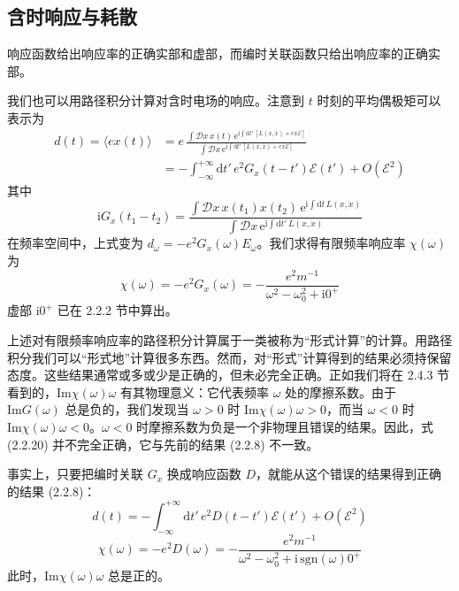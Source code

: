 \subsection{含时响应与耗散}

\begin{keypoints}
\item 响应函数给出响应率的正确实部和虚部，而编时关联函数只给出响应率的正确实部。
\end{keypoints}

我们也可以用路径积分计算对含时电场的响应。注意到 $t$ 时刻的平均偶极矩可以表示为
\begin{equation*}
\begin{aligned}
d(t)=\langle ex(t)\rangle&=e\,\frac{\int\mathcal{D}x\,x(t)\,\mathrm{e}^{\mathrm{i}\int\mathrm{d}t'\,[L(x,\dot{x})+ex\mathcal{E}]}}{\int\mathcal{D}x\,\mathrm{e}^{\mathrm{i}\int\mathrm{d}t'\,[L(x,\dot{x})+ex\mathcal{E}]}}\\
&=-\int_{-\infty}^{+\infty}\mathrm{d}t'\,e^2G_x(t-t')\mathcal{E}(t')+O(\mathcal{E}^2)
\end{aligned}
\end{equation*}
其中
\begin{equation*}
\mathrm{i}G_x(t_1-t_2)=\frac{\int\mathcal{D}x\,x(t_1)x(t_2)\,\mathrm{e}^{\mathrm{i}\int\mathrm{d}t\,L(x,\dot{x})}}{\int\mathcal{D}x\,\mathrm{e}^{\mathrm{i}\int\mathrm{d}t'\,L(x,\dot{x})}}
\end{equation*}
在频率空间中，上式变为 $d_\omega=-e^2G_x(\omega)E_\omega$。我们求得有限频率响应率 $\chi(\omega)$ 为
\begin{equation*}
\chi(\omega)=-e^2G_x(\omega)=-\frac{e^2m^{-1}}{\omega^2-\omega_0^2+\mathrm{i}0^+}\tag{2.2.20}
\end{equation*}
虚部 $\mathrm{i}0^+$ 已在 2.2.2 节中算出。

上述对有限频率响应率的路径积分计算属于一类被称为“形式计算”的计算。用路径积分我们可以“形式地”计算很多东西。然而，对“形式”计算得到的结果必须持保留态度。这些结果通常或多或少是正确的，但未必完全正确。正如我们将在 2.4.3 节看到的，$\mathrm{Im}\chi(\omega)\omega$ 有其物理意义：它代表频率 $\omega$ 处的摩擦系数。由于 $\mathrm{Im}G(\omega)$ 总是负的，我们发现当 $\omega>0$ 时 $\mathrm{Im}\chi(\omega)\omega>0$，而当 $\omega<0$ 时 $\mathrm{Im}\chi(\omega)\omega<0$。$\omega<0$ 时摩擦系数为负是一个非物理且错误的结果。因此，式 (2.2.20) 并不完全正确，它与先前的结果 (2.2.8) 不一致。

事实上，只要把编时关联 $G_x$ 换成响应函数 $D$，就能从这个错误的结果得到正确的结果 (2.2.8)：
\begin{equation*}
d(t)=-\int_{-\infty}^{+\infty}\mathrm{d}t'\,e^2D(t-t')\mathcal{E}(t')+O(\mathcal{E}^2)
\end{equation*}
\begin{equation*}
\chi(\omega)=-e^2D(\omega)=-\frac{e^2m^{-1}}{\omega^2-\omega_0^2+\mathrm{i}\,\mathrm{sgn}(\omega)0^+}
\end{equation*}
此时，$\mathrm{Im}\chi(\omega)\omega$ 总是正的。

